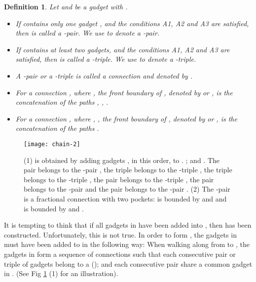 \documentclass[11pt]{article}
\newtheorem{definition}[figure]{Definition}
\begin{document}
\begin{definition}\label{def:connection}
Let  and  be a gadget with .
\begin{itemize}
\item If  contains only one gadget , and the
conditions A1, A2 and A3 are satisfied, then  is called a
{\em -pair}. We use  to denote a -pair.

\item If  contains at least two gadgets, and the conditions
A1, A2 and A3 are satisfied, then  is called a {\em -triple}.
We use  to denote a {\em -triple}.

\item A -pair  or a -triple  is
called a {\em connection} and denoted by .

\item For a connection ,
where ,
the {\em front boundary} of , denoted by 
or , is the concatenation of the paths
, , .

\item For a connection , where
,
, the {\em front boundary} of , denoted by
 or , is the concatenation of the paths
.
\end{itemize}
\end{definition}




\begin{figure}[t]
\begin{center}
\texttt{[image: chain-2]}
  \centering
\caption{(1)  is obtained by adding gadgets
, in this order, to .
;
 and
.
The pair  belongs to the -pair ,
the triple  belongs to the -triple
, the triple  belongs to the
-triple ,
the pair  belongs to the -triple ,
the pair  belongs to the -pair  and
the pair  belongs to the -pair .
(2) The -pair  is a fractional connection
with two pockets:  is bounded by  and 
and  is bounded by  and .
}
\label{fig:chain}
\end{center}
\vspace{-0.2in}
\end{figure}
It is tempting to think that if all gadgets in  have
been added into , then  has been constructed. Unfortunately,
this is not true. In order to form , the gadgets in 
must have been added to  in the following way: When walking
along  from  to , the gadgets in 
form a sequence 
of connections such that each consecutive pair  or
triple  of gadgets belong to a 
(); and each consecutive pair 
share a common gadget in .
(See Fig \ref{fig:chain} (1) for an illustration).
\end{document}
